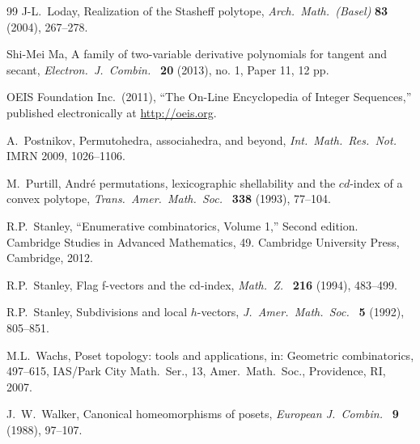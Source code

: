 \documentclass[reqno,12pt]{amsart}
\numberwithin{equation}{section}
\newcommand{\0}{\widehat{0}}
\newcommand{\1}{\widehat{1}}
\newcommand{\2}{\widehat{2}}
\begin{document}
\begin{thebibliography}{99}
J-L.\ Loday, 
Realization of the Stasheff polytope,
{\it Arch.\ Math.\ (Basel)} {\bf 83} (2004), 267--278.   

Shi-Mei Ma,
A family of two-variable derivative polynomials for tangent and secant,
{\it Electron.\ J.\ Combin.\ } {\bf 20} (2013), no. 1, Paper 11, 12 pp.   

OEIS Foundation Inc.\ (2011), ``The On-Line Encyclopedia of Integer Sequences,''
published electronically at \url{http://oeis.org}. 

A.\ Postnikov,
Permutohedra, associahedra, and beyond,
{\it Int.\ Math.\ Res.\ Not.\ } IMRN 2009, 1026--1106.

  M.\ Purtill,
Andr\'e permutations, lexicographic shellability and the $cd$-index of a
convex polytope, 
{\it Trans.\ Amer.\ Math.\ Soc.\ } {\bf 338} (1993), 77--104. 
  

R.P.\ Stanley, 
``Enumerative combinatorics, Volume 1,''
Second edition. Cambridge Studies in Advanced Mathematics, 49. Cambridge
University Press, Cambridge, 2012. 

R.P.\ Stanley, 
Flag f-vectors and the cd-index,
{\it Math.\ Z.\ } {\bf 216} (1994), 483--499.   

R.P.\ Stanley,
Subdivisions and local $h$-vectors,
{\it J.\ Amer.\ Math.\ Soc.\ } {\bf 5} (1992), 805--851.   


M.L.\ Wachs, 
Poset topology: tools and applications, in: Geometric combinatorics, 497--615,
IAS/Park City Math.\ Ser., 13, Amer.\ Math.\ Soc., Providence, RI, 2007.

J.\ W.\ Walker,
Canonical homeomorphisms of posets,
{\it European J.\ Combin.\ } {\bf 9} (1988), 97--107. 

\end{thebibliography}
\end{document}
